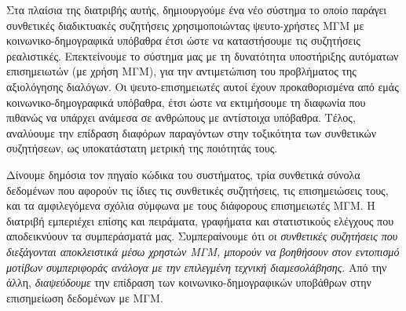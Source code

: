 Στα πλαίσια της διατριβής αυτής, δημιουργούμε ένα νέο σύστημα το οποίο παράγει συνθετικές διαδικτυακές συζητήσεις χρησιμοποιώντας ψευτο-χρήστες ΜΓΜ με κοινωνικο-δημογραφικά υπόβαθρα έτσι ώστε να καταστήσουμε τις συζητήσεις ρεαλιστικές. Επεκτείνουμε το σύστημα μας με τη δυνατότητα υποστήριξης αυτόματων επισημειωτών (με χρήση ΜΓΜ), για την αντιμετώπιση του προβλήματος της αξιολόγησης διαλόγων. Οι ψευτο-επισημειωτές αυτοί έχουν προκαθορισμένα από εμάς κοινωνικο-δημογραφικά υπόβαθρα, έτσι ώστε να εκτιμήσουμε τη διαφωνία που πιθανώς να υπάρχει ανάμεσα σε ανθρώπους με αντίστοιχα υπόβαθρα. Τέλος, αναλύουμε την επίδραση διαφόρων παραγόντων στην τοξικότητα των συνθετικών συζητήσεων, ως υποκατάστατη μετρική της ποιότητάς τους. 

Δίνουμε δημόσια τον πηγαίο κώδικα του συστήματος, τρία συνθετικά σύνολα δεδομένων που αφορούν τις ίδιες τις συνθετικές συζητήσεις, τις επισημειώσεις τους, και τα αμφιλεγόμενα σχόλια σύμφωνα με τους διάφορους επισημειωτές ΜΓΜ. Η διατριβή εμπεριέχει επίσης και πειράματα, γραφήματα και στατιστικούς ελέγχους που αποδεικνύουν τα συμπεράσματά μας. Συμπεραίνουμε ότι \textit{οι συνθετικές συζητήσεις που διεξάγονται αποκλειστικά μέσω χρηστών ΜΓΜ, μπορούν να βοηθήσουν στον εντοπισμό μοτίβων συμπεριφοράς ανάλογα με την επιλεγμένη τεχνική διαμεσολάβησης}. Από την άλλη, \textit{διαψεύδουμε} την επίδραση των κοινωνικο-δημογραφικών υποβάθρων στην επισημείωση δεδομένων με ΜΓΜ.

